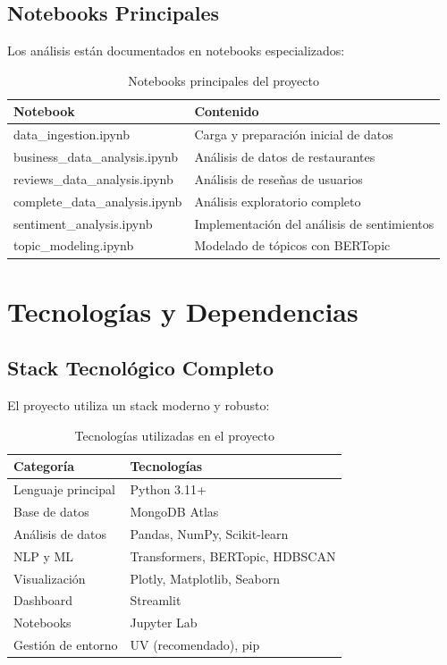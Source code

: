 \documentclass[12pt,a4paper,twoside,openany]{book}
\begin{document}
\subsection{Notebooks Principales}

Los análisis están documentados en notebooks especializados:

\begin{table}[H]
\centering
\caption{Notebooks principales del proyecto}
\begin{tabular}{@{}ll@{}}
\toprule
\textbf{Notebook} & \textbf{Contenido} \\
\midrule
data\_ingestion.ipynb & Carga y preparación inicial de datos \\
business\_data\_analysis.ipynb & Análisis de datos de restaurantes \\
reviews\_data\_analysis.ipynb & Análisis de reseñas de usuarios \\
complete\_data\_analysis.ipynb & Análisis exploratorio completo \\
sentiment\_analysis.ipynb & Implementación del análisis de sentimientos \\
topic\_modeling.ipynb & Modelado de tópicos con BERTopic \\
\bottomrule
\end{tabular}
\end{table}

\section{Tecnologías y Dependencias}

\subsection{Stack Tecnológico Completo}

El proyecto utiliza un stack moderno y robusto:

\begin{table}[H]
\centering
\caption{Tecnologías utilizadas en el proyecto}
\begin{tabular}{@{}ll@{}}
\toprule
\textbf{Categoría} & \textbf{Tecnologías} \\
\midrule
Lenguaje principal & Python 3.11+ \\
Base de datos & MongoDB Atlas \\
Análisis de datos & Pandas, NumPy, Scikit-learn \\
NLP y ML & Transformers, BERTopic, HDBSCAN \\
Visualización & Plotly, Matplotlib, Seaborn \\
Dashboard & Streamlit \\
Notebooks & Jupyter Lab \\
Gestión de entorno & UV (recomendado), pip \\
\bottomrule
\end{tabular}
\end{table}
\end{document}
